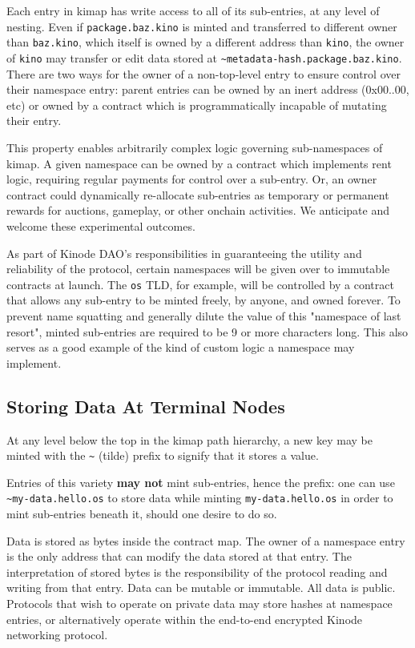 \documentclass[runningheads]{llncs}
\begin{document}
Each entry in kimap has write access to all of its sub-entries, at any level of nesting.
Even if \verb|package.baz.kino| is minted and transferred to different owner than \verb|baz.kino|, which itself is owned by a different address than \verb|kino|, the owner of \verb|kino| may transfer or edit data stored at \verb|~metadata-hash.package.baz.kino|.
There are two ways for the owner of a non-top-level entry to ensure control over their namespace entry: parent entries can be owned by an inert address (0x00..00, etc) or owned by a contract which is programmatically incapable of mutating their entry.

This property enables arbitrarily complex logic governing sub-namespaces of kimap.
A given namespace can be owned by a contract which implements rent logic, requiring regular payments for control over a sub-entry.
Or, an owner contract could dynamically re-allocate sub-entries as temporary or permanent rewards for auctions, gameplay, or other onchain activities.
We anticipate and welcome these experimental outcomes.

As part of Kinode DAO's responsibilities in guaranteeing the utility and reliability of the protocol, certain namespaces will be given over to immutable contracts at launch.
The \verb|os| TLD, for example, will be controlled by a contract that allows any sub-entry to be minted freely, by anyone, and owned forever.
To prevent name squatting and generally dilute the value of this "namespace of last resort", minted sub-entries are required to be 9 or more characters long.
This also serves as a good example of the kind of custom logic a namespace may implement.

\subsection{Storing Data At Terminal Nodes}

At any level below the top in the kimap path hierarchy, a new key may be minted with the \verb|~| (tilde) prefix to signify that it stores a value.

Entries of this variety \textbf{may not} mint sub-entries, hence the prefix: one can use \verb|~my-data.hello.os| to store data while minting \verb|my-data.hello.os| in order to mint sub-entries beneath it, should one desire to do so.

Data is stored as bytes inside the contract map.
The owner of a namespace entry is the only address that can modify the data stored at that entry.
The interpretation of stored bytes is the responsibility of the protocol reading and writing from that entry.
Data can be mutable or immutable.
All data is public.
Protocols that wish to operate on private data may store hashes at namespace entries, or alternatively operate within the end-to-end encrypted Kinode networking protocol.
\end{document}
